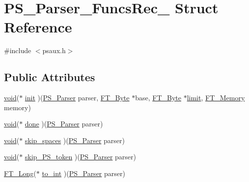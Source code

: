 \hypertarget{struct_p_s___parser___funcs_rec__}{\section{P\-S\-\_\-\-Parser\-\_\-\-Funcs\-Rec\-\_\- Struct Reference}
\label{struct_p_s___parser___funcs_rec__}
}


{\ttfamily \#include $<$psaux.\-h$>$}

\subsection*{Public Attributes}
\begin{DoxyCompactItemize}
\item 
\hyperlink{wglew_8h_aeea6e3dfae3acf232096f57d2d57f084}{void}($\ast$ \hyperlink{struct_p_s___parser___funcs_rec___ab85cca9562d53b5ee3142e0f5c1b8a9b}{init} )(\hyperlink{psaux_8h_ac4ccf6a7b29344497180cdbc540b31de}{P\-S\-\_\-\-Parser} parser, \hyperlink{fttypes_8h_a51f26183ca0c9f4af958939648caeccd}{F\-T\-\_\-\-Byte} $\ast$base, \hyperlink{fttypes_8h_a51f26183ca0c9f4af958939648caeccd}{F\-T\-\_\-\-Byte} $\ast$\hyperlink{glew_8h_a702e6dc059ad96a3ec3e24fd769fd6ac}{limit}, \hyperlink{ftsystem_8h_a67ec7ea35cde99a89a65e9f827a9ad3a}{F\-T\-\_\-\-Memory} memory)
\item 
\hyperlink{wglew_8h_aeea6e3dfae3acf232096f57d2d57f084}{void}($\ast$ \hyperlink{struct_p_s___parser___funcs_rec___a9351f4dfa31c817d74c1a65741a71c8d}{done} )(\hyperlink{psaux_8h_ac4ccf6a7b29344497180cdbc540b31de}{P\-S\-\_\-\-Parser} parser)
\item 
\hyperlink{wglew_8h_aeea6e3dfae3acf232096f57d2d57f084}{void}($\ast$ \hyperlink{struct_p_s___parser___funcs_rec___a3ebff5e8cf80ee2051858bc456c2f388}{skip\-\_\-spaces} )(\hyperlink{psaux_8h_ac4ccf6a7b29344497180cdbc540b31de}{P\-S\-\_\-\-Parser} parser)
\item 
\hyperlink{wglew_8h_aeea6e3dfae3acf232096f57d2d57f084}{void}($\ast$ \hyperlink{struct_p_s___parser___funcs_rec___a786db660e0ba4418b2e60e2b91c3f1e9}{skip\-\_\-\-P\-S\-\_\-token} )(\hyperlink{psaux_8h_ac4ccf6a7b29344497180cdbc540b31de}{P\-S\-\_\-\-Parser} parser)
\item 
\hyperlink{fttypes_8h_a7fa72a1f0e79fb1860c5965789024d6f}{F\-T\-\_\-\-Long}($\ast$ \hyperlink{struct_p_s___parser___funcs_rec___a59a2017715d1a0db810c6e38ad3a4a67}{to\-\_\-int} )(\hyperlink{psaux_8h_ac4ccf6a7b29344497180cdbc540b31de}{P\-S\-\_\-\-Parser} parser)
\item 

\end{DoxyCompactItemize}
